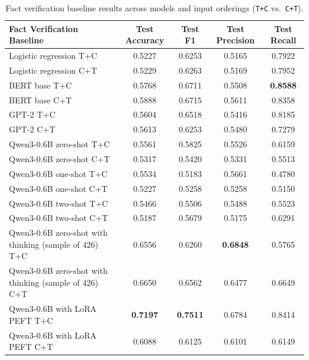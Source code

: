 \begin{table}[ht]
\centering
\small
\begin{tabular}{p{5.5cm} c c c c}
\hline
\textbf{Fact Verification Baseline} & \textbf{Test Accuracy} & \textbf{Test F1} & \textbf{Test Precision} & \textbf{Test Recall} \\
\hline
Logistic regression T+C & 0.5227 & 0.6253 & 0.5165 & 0.7922 \\
Logistic regression C+T & 0.5229 & 0.6263 & 0.5169 & 0.7952 \\[4pt]
BERT base T+C & 0.5768 & 0.6711 & 0.5508 & \textbf{0.8588} \\
BERT base C+T & 0.5888 & 0.6715 & 0.5611 & 0.8358 \\[4pt]
GPT-2 T+C & 0.5604 & 0.6518 & 0.5416 & 0.8185 \\
GPT-2 C+T & 0.5613 & 0.6253 & 0.5480 & 0.7279 \\[4pt]
Qwen3-0.6B zero-shot T+C & 0.5561 & 0.5825 & 0.5526 & 0.6159 \\
Qwen3-0.6B zero-shot C+T & 0.5317 & 0.5420 & 0.5331 & 0.5513 \\
Qwen3-0.6B one-shot T+C & 0.5534 & 0.5183 & 0.5661 & 0.4780 \\
Qwen3-0.6B one-shot C+T & 0.5227 & 0.5258 & 0.5258 & 0.5150 \\
Qwen3-0.6B two-shot T+C & 0.5466 & 0.5506 & 0.5488 & 0.5523 \\
Qwen3-0.6B two-shot C+T & 0.5187 & 0.5679 & 0.5175 & 0.6291 \\[4pt]
Qwen3-0.6B zero-shot with thinking (sample of 426) T+C & 0.6556 & 0.6260 & \textbf{0.6848} & 0.5765 \\
Qwen3-0.6B zero-shot with thinking (sample of 426) C+T & 0.6650 & 0.6562 & 0.6477 & 0.6649 \\[4pt]
Qwen3-0.6B with LoRA PEFT T+C & \textbf{0.7197} & \textbf{0.7511} & 0.6784 & 0.8414 \\
Qwen3-0.6B with LoRA PEFT C+T & 0.6088 & 0.6125 & 0.6101 & 0.6149 \\
\hline
\end{tabular}
\caption{Fact verification baseline results across models and input orderings (\texttt{T+C} vs.\ \texttt{C+T}).}
\label{tab:tabfact_baseline_results}
\end{table}